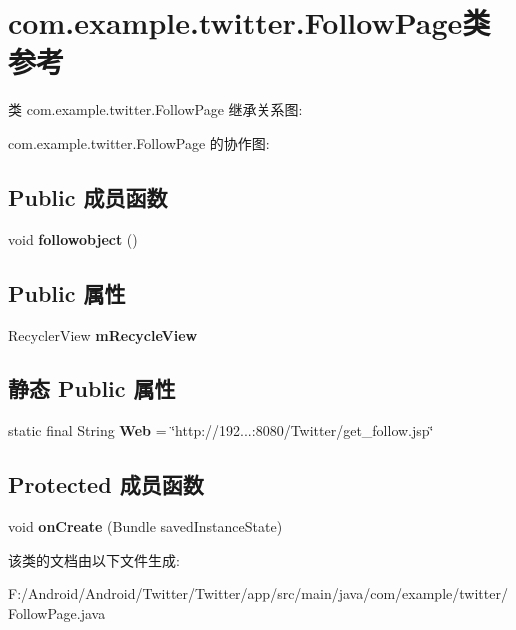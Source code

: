 \hypertarget{classcom_1_1example_1_1twitter_1_1_follow_page}{}\section{com.\+example.\+twitter.\+Follow\+Page类 参考}
\label{classcom_1_1example_1_1twitter_1_1_follow_page}


类 com.\+example.\+twitter.\+Follow\+Page 继承关系图\+:


com.\+example.\+twitter.\+Follow\+Page 的协作图\+:
\subsection*{Public 成员函数}
\begin{DoxyCompactItemize}
\item 
\mbox{\label{classcom_1_1example_1_1twitter_1_1_follow_page_a76abac096f905cfa9001992ef08f2683}} 
void {\bfseries followobject} ()
\end{DoxyCompactItemize}
\subsection*{Public 属性}
\begin{DoxyCompactItemize}
\item 
\mbox{\label{classcom_1_1example_1_1twitter_1_1_follow_page_aefb5ea35076578e9da1b97a7f19c15a0}} 
Recycler\+View {\bfseries m\+Recycle\+View}
\end{DoxyCompactItemize}
\subsection*{静态 Public 属性}
\begin{DoxyCompactItemize}
\item 
\mbox{\label{classcom_1_1example_1_1twitter_1_1_follow_page_a9639c68b34a97b4d0fda0e66f8b66879}} 
static final String {\bfseries Web} = \char`\"{}http\+://192...\+:8080/Twitter/get\+\_\+follow.\+jsp\char`\"{}
\end{DoxyCompactItemize}
\subsection*{Protected 成员函数}
\begin{DoxyCompactItemize}
\item 
\mbox{\label{classcom_1_1example_1_1twitter_1_1_follow_page_a88dd9c16415738d8595652f7a9ace7fa}} 
void {\bfseries on\+Create} (Bundle saved\+Instance\+State)
\end{DoxyCompactItemize}


该类的文档由以下文件生成\+:\begin{DoxyCompactItemize}
\item 
F\+:/\+Android/\+Android/\+Twitter/\+Twitter/app/src/main/java/com/example/twitter/Follow\+Page.\+java\end{DoxyCompactItemize}
